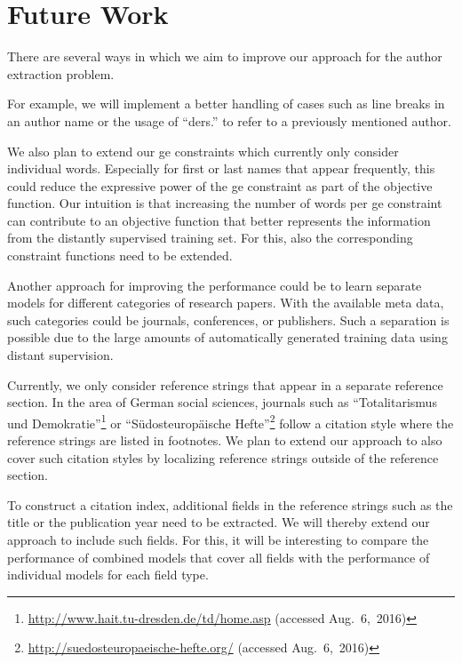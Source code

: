 \section{Future Work}\label{sec:future-work}

There are several ways in which we aim to improve our approach for the author extraction problem.

For example, we will implement a better handling of cases such as line breaks in an author name or the usage of ``ders.'' to refer to a previously mentioned author.

We also plan to extend our \glspl{ge constraint} which currently only consider individual words.
Especially for first or last names that appear frequently, this could reduce the expressive power of the \gls{ge constraint} as part of the \gls{objective function}.
Our intuition is that increasing the number of words per \gls{ge constraint} can contribute to an \gls{objective function} that better represents the information from the distantly supervised training set.
For this, also the corresponding constraint functions need to be extended.

Another approach for improving the performance could be to learn separate models for different categories of research papers.
With the available meta data, such categories could be journals, conferences, or publishers.
Such a separation is possible due to the large amounts of automatically generated training data using distant supervision.

Currently, we only consider reference strings that appear in a separate reference section.
In the area of German social sciences, journals such as ``Totalitarismus und Demokratie''\footnote{\url{http://www.hait.tu-dresden.de/td/home.asp} (accessed Aug.~6,~2016)} or ``S\"{u}dosteuropäische Hefte''\footnote{\url{http://suedosteuropaeische-hefte.org/} (accessed Aug.~6,~2016)} follow a citation style where the reference strings are listed in footnotes.
We plan to extend our approach to also cover such citation styles by localizing reference strings outside of the reference section.

\bigskip

To construct a citation index, additional fields in the reference strings such as the title or the publication year need to be extracted.
We will thereby extend our approach to include such fields.
For this, it will be interesting to compare the performance of combined models that cover all fields with the performance of individual models for each field type.

